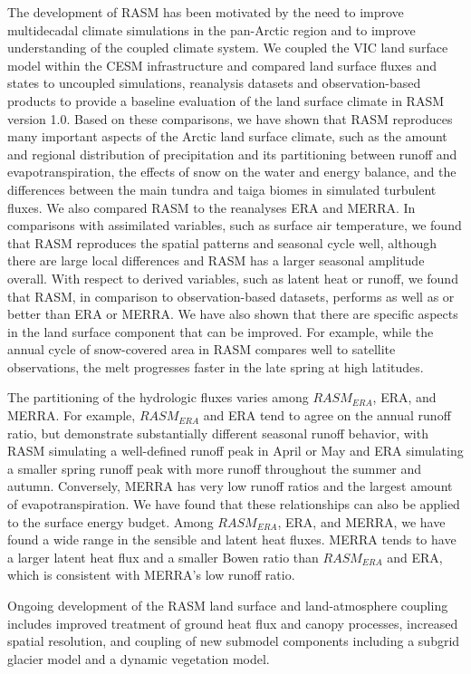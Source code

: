 The development of RASM has been motivated by the need to improve multidecadal climate simulations in the pan-Arctic region and to improve understanding of the coupled climate system.
We coupled the VIC land surface model within the CESM infrastructure and compared land surface fluxes and states to uncoupled simulations, reanalysis datasets and observation-based products to provide a baseline evaluation of the land surface climate in RASM version 1.0.
Based on these comparisons, we have shown that RASM reproduces many important aspects of the Arctic land surface climate, such as the amount and regional distribution of precipitation and its partitioning between runoff and evapotranspiration, the effects of snow on the water and energy balance, and the differences between the main tundra and taiga biomes in simulated turbulent fluxes.
We also compared RASM to the reanalyses ERA and MERRA.
In comparisons with assimilated variables, such as surface air temperature, we found that RASM reproduces the spatial patterns and seasonal cycle well, although there are large local differences and RASM has a larger seasonal amplitude overall.
With respect to derived variables, such as latent heat or runoff, we found that RASM, in comparison to observation-based datasets, performs as well as or better than ERA or MERRA.
We have also shown that there are specific aspects in the land surface component that can be improved.
For example, while the annual cycle of snow-covered area in RASM compares well to satellite observations, the melt progresses faster in the late spring at high latitudes.

The partitioning of the hydrologic fluxes varies among $RASM_{ERA}$, ERA, and MERRA.
For example, $RASM_{ERA}$ and ERA tend to agree on the annual runoff ratio, but demonstrate substantially different seasonal runoff behavior, with RASM simulating a well-defined runoff peak in April or May and ERA simulating a smaller spring runoff peak with more runoff throughout the summer and autumn.
Conversely, MERRA has very low runoff ratios and the largest amount of evapotranspiration.
We have found that these relationships can also be applied to the surface energy budget.
Among $RASM_{ERA}$, ERA, and MERRA, we have found a wide range in the sensible and latent heat fluxes.
MERRA tends to have a larger latent heat flux and a smaller Bowen ratio than $RASM_{ERA}$ and ERA, which is consistent with MERRA's low runoff ratio.

Ongoing development of the RASM land surface and land-atmosphere coupling includes improved treatment of ground heat flux and canopy processes, increased spatial resolution, and coupling of new submodel components including a subgrid glacier model and a dynamic vegetation model.

